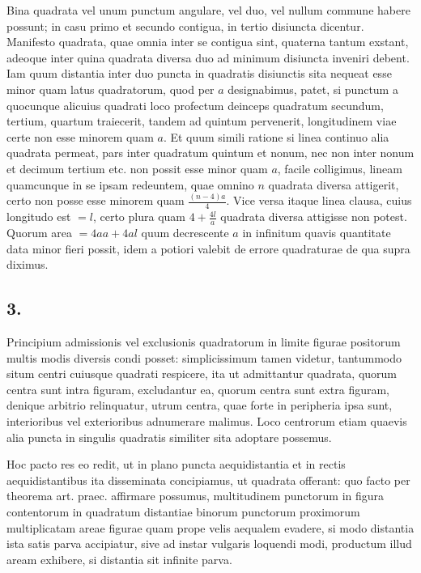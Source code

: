 \documentclass[12pt]{article}
\begin{document}
Bina quadrata vel unum punctum angulare, vel duo, vel nullum commune habere possunt; in casu primo et secundo contigua, in tertio disiuncta dicentur. Manifesto quadrata, quae omnia inter se contigua sint, quaterna tantum exstant, adeoque inter quina quadrata diversa duo ad minimum disiuncta inveniri debent. Iam quum distantia inter duo puncta in quadratis disiunctis sita nequeat esse minor quam latus quadratorum, quod per $a$ designabimus, patet, si punctum a quocunque alicuius quadrati loco profectum deinceps quadratum secundum, tertium, quartum traiecerit, tandem ad quintum pervenerit, longitudinem viae certe non esse minorem quam $a$. Et quum simili ratione si linea continuo alia quadrata permeat, pars inter quadratum quintum et nonum, nec non inter nonum et decimum tertium etc. non possit esse minor quam $a$, facile colligimus, lineam quamcunque in se ipsam redeuntem, quae omnino $n$ quadrata diversa attigerit, certo non posse esse minorem quam $\frac{(n-4)a}{4}$. Vice versa itaque linea clausa, cuius longitudo est $=l$, certo plura quam $4+\frac{4l}{a}$ quadrata diversa attigisse non potest. Quorum area $=4aa+4al$ quum decrescente $a$ in infinitum quavis quantitate data minor fieri possit, idem a potiori valebit de errore quadraturae de qua supra diximus.

\subsection*{3.}

Principium admissionis vel exclusionis quadratorum in limite figurae positorum multis modis diversis condi posset: simplicissimum tamen videtur, tantummodo situm centri cuiusque quadrati respicere, ita ut admittantur quadrata, quorum centra sunt intra figuram, excludantur ea, quorum centra sunt extra figuram, denique arbitrio relinquatur, utrum centra, quae forte in peripheria ipsa sunt, interioribus vel exterioribus adnumerare malimus. Loco centrorum etiam quaevis alia puncta in singulis quadratis similiter sita adoptare possemus.

Hoc pacto res eo redit, ut in plano puncta aequidistantia et in rectis aequidistantibus ita disseminata concipiamus, ut quadrata offerant: quo facto per theorema art. praec. affirmare possumus, multitudinem punctorum in figura contentorum in quadratum distantiae binorum punctorum proximorum multiplicatam areae figurae quam prope velis aequalem evadere, si modo distantia ista satis parva accipiatur, sive ad instar vulgaris loquendi modi, productum illud aream exhibere, si distantia sit infinite parva.
\end{document}
